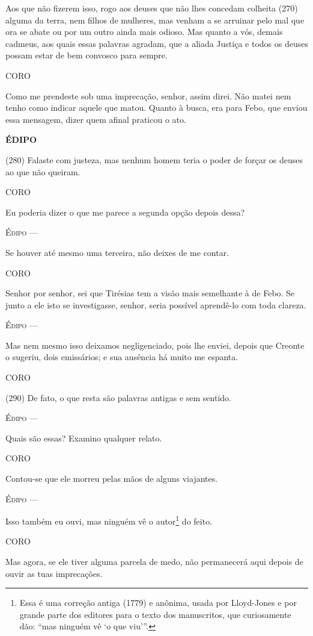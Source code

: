 Aos que não fizerem isso, rogo aos deuses que não lhes concedam colheita
(270) alguma da terra, nem filhos de mulheres, mas venham a se arruinar
pelo mal que ora se abate ou por um outro ainda mais odioso. Mas quanto
a vós, demais cadmeus, aos quais essas palavras agradam, que a aliada
Justiça e todos os deuses possam estar de bem convosco para sempre.

\textsc{CORO}

Como me prendeste sob uma imprecação, senhor, assim direi. Não matei nem
tenho como indicar aquele que matou. Quanto à busca, era para Febo, que
enviou essa mensagem, dizer quem afinal praticou o ato.

\textbf{ÉDIPO }

(280) Falaste com justeza, mas nenhum homem teria o poder de forçar os
deuses ao que não queiram.

\textsc{CORO}

Eu poderia dizer o que me parece a segunda opção depois dessa?

\textsc{Édipo} ---

Se houver até mesmo uma terceira, não deixes de me contar.

\textsc{CORO}

Senhor por senhor, sei que Tirésias tem a visão mais semelhante à de
Febo. Se junto a ele isto se investigasse, senhor, seria possível
aprendê-lo com toda clareza.

\textsc{Édipo} ---

Mas nem mesmo isso deixamos negligenciado, pois lhe enviei, depois que
Creonte o sugeriu, dois emissários; e sua ausência há muito me espanta.

\textsc{CORO}

(290) De fato, o que resta são palavras antigas e sem sentido.

\textsc{Édipo} ---

Quais são essas? Examino qualquer relato.

\textsc{CORO}

Contou-se que ele morreu pelas mãos de alguns viajantes.

\textsc{Édipo} ---

Isso também eu ouvi, mas ninguém vê o autor\footnote{Essa é uma correção
  antiga (1779) e anônima, usada por Lloyd-Jones e por grande parte dos
  editores para o texto dos manuscritos, que curiosamente dão: ``mas
  ninguém vê `o que viu'''.} do feito.

\textsc{CORO}

Mas agora, se ele tiver alguma parcela de medo, não permanecerá aqui
depois de ouvir as tuas imprecações.

